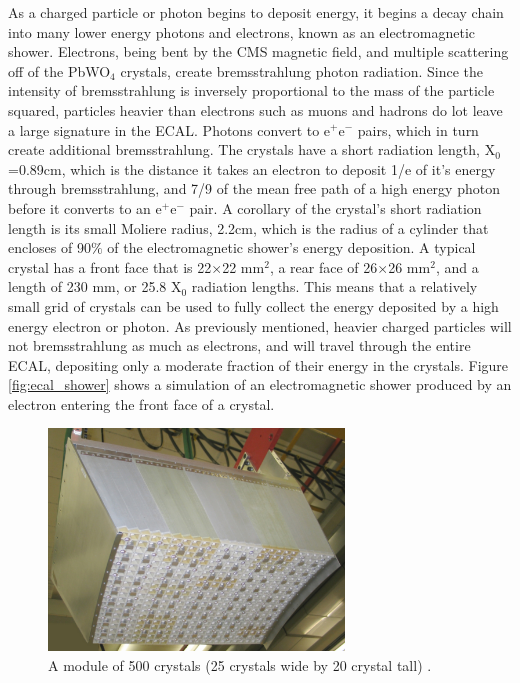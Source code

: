 \par As a charged particle or photon begins to deposit energy, it
begins a decay chain into many lower energy photons and electrons,
known as an electromagnetic shower.  Electrons, being bent by the CMS
magnetic field, and multiple scattering off of the PbWO$_{4}$
crystals, create bremsstrahlung photon radiation.  Since the intensity
of bremsstrahlung is inversely proportional to the mass of the
particle squared, particles heavier than electrons such as muons and
hadrons do lot leave a large signature in the ECAL.  Photons convert
to e$^{+}$e$^{-}$ pairs, which in turn create additional
bremsstrahlung. The crystals have a short radiation length,
X$_{0}$=0.89cm, which is the distance it takes an electron to deposit
1/e of it's energy through bremsstrahlung, and 7/9 of the mean free
path of a high energy photon before it converts to an  e$^{+}$e$^{-}$
pair.  A corollary of the crystal's short radiation length is its
small Moliere radius, 2.2cm, which is the radius of a cylinder that
encloses of 90$\%$ of the electromagnetic shower's energy
deposition. A typical crystal has a front face that is 22$\times$22
mm$^{2}$, a rear face of 26$\times$26 mm$^{2}$, and a length of 230
mm, or 25.8 X$_{0}$ radiation lengths.  This means that a relatively
small grid of crystals can be used to fully collect the energy
deposited by a high energy electron or photon.  As previously
mentioned, heavier charged particles will not bremsstrahlung as much
as electrons, and will travel through the entire ECAL, depositing only
a moderate fraction of their energy in the crystals.  Figure
\ref{fig:ecal_shower} shows a simulation of an electromagnetic shower
produced by an electron entering the front face of a crystal.      

\begin{figure}[h]
   \centering
  \includegraphics[width=0.7\textwidth]{Figures/CMS_Diagrams/ECAL__Xtal_Module.pdf}
  \caption{A module of 500 crystals (25 crystals wide by 20 crystal
    tall) \cite{CMS:CMS_Machine_Chatrchyan:2008aa}. } \label{fig:ecal_xtal_module}
\end{figure}


